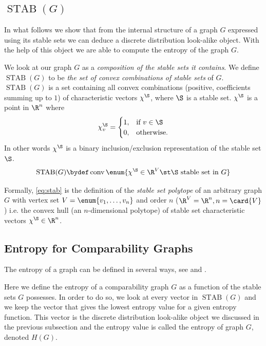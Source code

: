 \subsection{$\operatorname{STAB}(G)$}
\label{tree:poset:graph:stab}

In what follows we show that from the internal structure of a graph $G$
expressed using its stable sets we can deduce a discrete distribution
look-alike object. With the help of this object we are able to compute the
entropy of the graph $G$.

We look at our graph $G$ as a \emph{composition of the
stable sets it contains}. We define $\operatorname{STAB}(G)$ to be \emph{the set of convex
combinations of stable sets} of $G$.
$\operatorname{STAB}(G)$ is a set containing all convex combinations (positive,
coefficients summing up to $1$) of characteristic vectors $\chi^{\S}$, where $\S$
is a stable set. $\chi^{\S}$ is a point in $\R^n$ where
\begin{displaymath}
\chi^{\S}_v =\begin{cases}
      1, & \text{if}\ v \in \S\\
      0, & \text{otherwise}.
    \end{cases}
\end{displaymath}
In other words $\chi^{\S}$ is a binary inclusion/exclusion representation of the
stable set $\S$.
\begin{equation}
\operatorname{STAB}(G) \bydef \operatorname{conv}\enum{\chi^{\S} \in \R^V \st
\S\text{ stable set in }G}
\label{eq:stab}
\end{equation}

Formally, \ref{eq:stab} is the definition of the \emph{stable set polytope} of
an arbitrary graph $G$ with vertex set $V = \enum{v_1, \ldots, v_n }$
and order $n$ ($\R^V = \R^n, n = \card{V}$) i.e. the convex hull (an $n$-dimensional
polytope) of stable set characteristic vectors $\chi^{\S} \in \R^n$.



\subsection{Entropy for Comparability Graphs}

The entropy of a graph can be defined in several ways, see
\citet*{mowshowitz2012entropy} and \citet*{simonyi1995graph}.

Here we define the entropy of a comparability graph $G$ as a function of the
stable sets $G$ possesses. In order to do so, we look at every vector in
$\operatorname{STAB}(G)$ and we keep the vector that gives the lowest entropy
value for a given entropy function. This vector is the discrete distribution
look-alike object we discussed in the previous subsection and the
entropy value is called the entropy of graph $G$, denoted ${H}(G)$.

